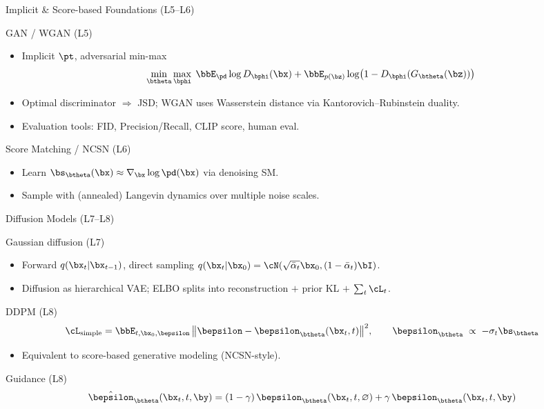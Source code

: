 \documentclass{beamer}
\begin{document}
\begin{frame}{Implicit \& Score-based Foundations (L5--L6)}
	\begin{block}{GAN / WGAN (L5)}
		\begin{itemize}
			\item Implicit $\pt$, adversarial min-max
			\[
				\min_{\btheta}\max_{\bphi}\;\bbE_{\pd}\log D_{\bphi}(\bx) + \bbE_{p(\bz)}\log\bigl(1-D_{\bphi}(G_{\btheta}(\bz))\bigr)
			\]
			\item Optimal discriminator $\Rightarrow$ JSD; WGAN uses Wasserstein distance via Kantorovich--Rubinstein duality.
			\item Evaluation tools: FID, Precision/Recall, CLIP score, human eval.
		\end{itemize}
	\end{block}
	\begin{block}{Score Matching / NCSN (L6)}
		\begin{itemize}
			\item Learn $\bs_{\btheta}(\bx)\approx\nabla_{\bx}\log \pd(\bx)$ via denoising SM.
			\item Sample with (annealed) Langevin dynamics over multiple noise scales.
		\end{itemize}
	\end{block}
\end{frame}
\begin{frame}{Diffusion Models (L7--L8)}
	\begin{block}{Gaussian diffusion (L7)}
		\begin{itemize}
			\item Forward $q(\bx_t|\bx_{t-1})$, direct sampling $q(\bx_t|\bx_0)=\cN(\sqrt{\bar\alpha_t}\bx_0,(1-\bar\alpha_t)\bI)$.
			\item Diffusion as hierarchical VAE; ELBO splits into reconstruction $+$ prior KL $+$ $\sum_t \cL_t$.
		\end{itemize}
	\end{block}
	\begin{block}{DDPM (L8)}
		\vspace{-0.3cm}
		\[
			\cL_{\text{simple}} = \bbE_{t,\bx_0,\bepsilon}\,\bigl\|\bepsilon-\bepsilon_{\btheta}(\bx_t,t)\bigr\|^2,
			\qquad \bepsilon_{\btheta} \;\propto\; -\sigma_t \bs_{\btheta}
		\]
		\vspace{-0.3cm}
		\begin{itemize}
			\item Equivalent to score-based generative modeling (NCSN-style).
		\end{itemize}
	\end{block}
	\begin{block}{Guidance (L8)}
		\vspace{-0.3cm}
		\[
			\hat{\bepsilon}_{\btheta}(\bx_t,t,\by)
			= (1-\gamma)\,\bepsilon_{\btheta}(\bx_t,t,\varnothing) + \gamma\,\bepsilon_{\btheta}(\bx_t,t,\by)
		\]
	\end{block}
\end{frame}
\end{document}
